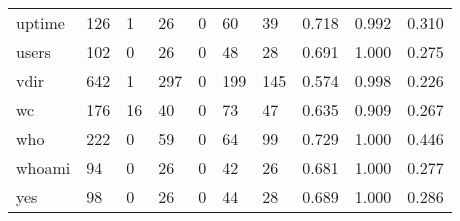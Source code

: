 \begin{longtable}{lp{1.3cm}p{1.3cm}p{1.3cm}p{1.3cm}p{1.3cm}p{1.3cm}p{1.3cm}p{1.3cm}p{1.3cm}}
uptime    &                    126 &                                  1 &                                26 &                                0 &                                60 &                              39 &                                0.718 &                                  0.992 &                                0.310 \\
users     &                    102 &                                  0 &                                26 &                                0 &                                48 &                              28 &                                0.691 &                                  1.000 &                                0.275 \\
vdir      &                    642 &                                  1 &                               297 &                                0 &                               199 &                             145 &                                0.574 &                                  0.998 &                                0.226 \\
wc        &                    176 &                                 16 &                                40 &                                0 &                                73 &                              47 &                                0.635 &                                  0.909 &                                0.267 \\
who       &                    222 &                                  0 &                                59 &                                0 &                                64 &                              99 &                                0.729 &                                  1.000 &                                0.446 \\
whoami    &                     94 &                                  0 &                                26 &                                0 &                                42 &                              26 &                                0.681 &                                  1.000 &                                0.277 \\
yes       &                     98 &                                  0 &                                26 &                                0 &                                44 &                              28 &                                0.689 &                                  1.000 &                                0.286 \\
\end{longtable}
